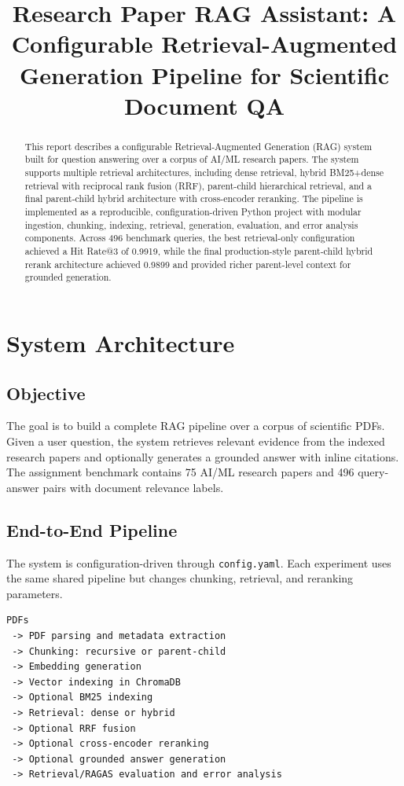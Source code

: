 \documentclass[11pt]{article}
\title{\vspace{-1em}\textbf{Research Paper RAG Assistant: A Configurable Retrieval-Augmented Generation Pipeline for Scientific Document QA}\vspace{-0.5em}}
\newcommand{\code}[1]{\texttt{#1}}
\begin{document}
\maketitle

\begin{abstract}
This report describes a configurable Retrieval-Augmented Generation (RAG) system built for question answering over a corpus of AI/ML research papers. The system supports multiple retrieval architectures, including dense retrieval, hybrid BM25+dense retrieval with reciprocal rank fusion (RRF), parent-child hierarchical retrieval, and a final parent-child hybrid architecture with cross-encoder reranking. The pipeline is implemented as a reproducible, configuration-driven Python project with modular ingestion, chunking, indexing, retrieval, generation, evaluation, and error analysis components. Across 496 benchmark queries, the best retrieval-only configuration achieved a Hit Rate@3 of 0.9919, while the final production-style parent-child hybrid rerank architecture achieved 0.9899 and provided richer parent-level context for grounded generation.
\end{abstract}

\section{System Architecture}

\subsection{Objective}
The goal is to build a complete RAG pipeline over a corpus of scientific PDFs. Given a user question, the system retrieves relevant evidence from the indexed research papers and optionally generates a grounded answer with inline citations. The assignment benchmark contains 75 AI/ML research papers and 496 query-answer pairs with document relevance labels.

\subsection{End-to-End Pipeline}
The system is configuration-driven through \code{config.yaml}. Each experiment uses the same shared pipeline but changes chunking, retrieval, and reranking parameters.

\begin{verbatim}
PDFs
 -> PDF parsing and metadata extraction
 -> Chunking: recursive or parent-child
 -> Embedding generation
 -> Vector indexing in ChromaDB
 -> Optional BM25 indexing
 -> Retrieval: dense or hybrid
 -> Optional RRF fusion
 -> Optional cross-encoder reranking
 -> Optional grounded answer generation
 -> Retrieval/RAGAS evaluation and error analysis
\end{verbatim}
\end{document}
